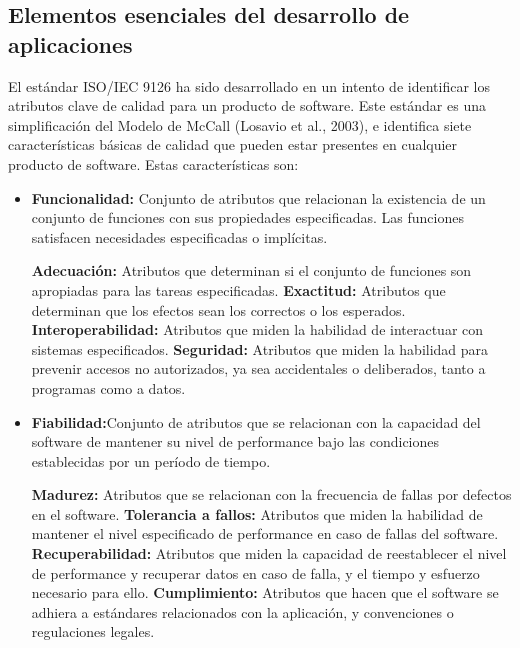 \begin{center}
    
    \section{Elementos esenciales del desarrollo de aplicaciones}

    El estándar ISO/IEC 9126 ha sido desarrollado en
    un intento de identificar los atributos clave de
    calidad para un producto de software. Este
    estándar es una simplificación del Modelo de
    McCall (Losavio et al., 2003), e identifica siete
    características básicas de calidad que pueden
    estar presentes en cualquier producto de software.
    Estas características son:
    \begin{itemize}
        \item \textbf{Funcionalidad:} Conjunto de atributos que relacionan la
        existencia de un conjunto de funciones con sus
        propiedades especificadas. Las funciones satisfacen
        necesidades especificadas o implícitas.

            \subitem \textbf{Adecuación:} Atributos que determinan si el conjunto de
                funciones son apropiadas para las tareas especificadas.
            \subitem \textbf{Exactitud:} Atributos que determinan que los efectos
             sean los correctos o los esperados.
            \subitem \textbf{Interoperabilidad:} Atributos que miden la habilidad de
                interactuar con sistemas especificados.
            \subitem \textbf{Seguridad:} Atributos que miden la habilidad para
                prevenir accesos no autorizados, ya sea accidentales o
                deliberados, tanto a programas como a datos.

        \item \textbf{Fiabilidad:}Conjunto de atributos que se relacionan con
        la capacidad del software de mantener su nivel de
        performance bajo las condiciones establecidas por un
        período de tiempo.

            \subitem \textbf{Madurez:} Atributos que se relacionan con la frecuencia
                de fallas por defectos en el software.
            \subitem \textbf{Tolerancia a fallos:} Atributos que miden la habilidad
                de mantener el nivel especificado de performance en
                caso de fallas del software.
            \subitem \textbf{Recuperabilidad:} Atributos que miden la capacidad de
                reestablecer el nivel de performance y recuperar datos
                en caso de falla, y el tiempo y esfuerzo necesario para
                ello.
            \subitem \textbf{Cumplimiento:} Atributos que hacen que el software se
                adhiera a estándares relacionados con la aplicación, y
                convenciones o regulaciones legales.
            

\end{itemize}
\end{center}
